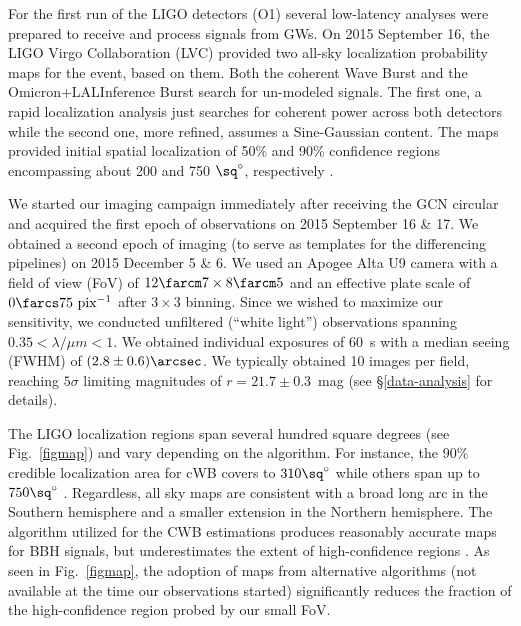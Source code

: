 \documentclass[apjl]{emulateapj}
\begin{document}
For the first run of the LIGO detectors (O1) several low-latency analyses were prepared to receive and process signals from GWs. On 2015 September 16, the LIGO Virgo Collaboration (LVC) provided two all-sky localization probability maps for the event, based on them. Both the coherent Wave Burst \citep[cWB;][]{Klimenko2016} and the Omicron+LALInference Burst \citep[oLIB;][]{Lynch2015} search for un-modeled signals. The first one, a rapid localization analysis just searches for coherent power across both detectors while the second one, more refined, assumes a Sine-Gaussian content. The maps provided initial spatial localization of 50\% and 90\% confidence regions encompassing about 200 and 750 $\sq^{\circ}$, respectively  \citep[][GCN\#18330]{Singer2015}.

We started our imaging campaign immediately after receiving the GCN circular and acquired the first epoch of observations on 2015 September 16 \& 17. We obtained a second epoch of imaging (to serve as templates for the differencing pipelines) on 2015 December 5 \& 6. We used an Apogee Alta U9 camera with a field of view (FoV) of $12\farcm 7 \times 8\farcm 5$ and an effective plate scale of $0\farcs 75 \  {\rm pix}^{-1}$ after $3\times 3$ binning. Since we wished to maximize our sensitivity, we conducted unfiltered (``white light'') observations spanning $0.35 < \lambda/\mu m < 1$. We obtained individual exposures of 60~s with a median seeing (FWHM) of $(2.8\pm0.6)\arcsec$. We typically obtained 10 images per field, reaching $5\sigma$ limiting magnitudes of $r=21.7\pm0.3$~mag (see \S\ref{data-analysis} for details).

The LIGO localization regions span several hundred square degrees (see Fig.~\ref{figmap}) and vary depending on the algorithm. For instance, the $90\%$ credible localization area for cWB covers to $310\sq^{\circ}$ while others span up to $750\sq^{\circ}$ \citep[see table 1 in][]{Abbott2016d}. Regardless, all sky maps are consistent with a broad long arc in the Southern hemisphere and a smaller extension in the Northern hemisphere.  The algorithm utilized for the CWB estimations produces reasonably accurate maps for BBH signals, but underestimates the extent of high-confidence regions \citep{Essick2015}. As seen in Fig.~\ref{figmap}, the adoption of maps from alternative algorithms (not available at the time our observations started) significantly reduces the fraction of the high-confidence region probed by our small FoV.
\end{document}
